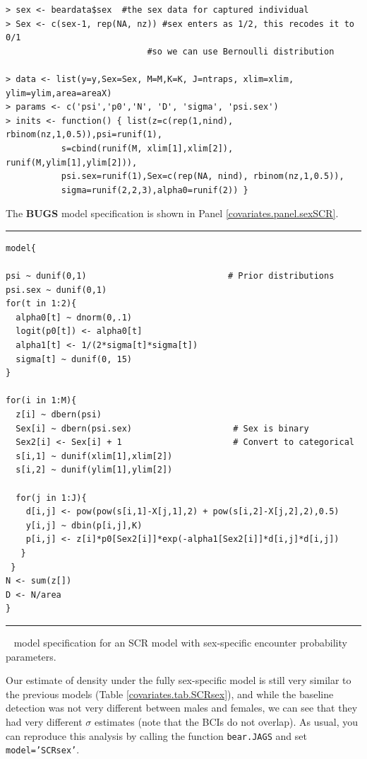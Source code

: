 {\small
\begin{verbatim}
> sex <- beardata$sex  #the sex data for captured individual
> Sex <- c(sex-1, rep(NA, nz)) #sex enters as 1/2, this recodes it to 0/1
                            #so we can use Bernoulli distribution 

> data <- list(y=y,Sex=Sex, M=M,K=K, J=ntraps, xlim=xlim, ylim=ylim,area=areaX)
> params <- c('psi','p0','N', 'D', 'sigma', 'psi.sex')
> inits <- function() { list(z=c(rep(1,nind), rbinom(nz,1,0.5)),psi=runif(1), 
           s=cbind(runif(M, xlim[1],xlim[2]), runif(M,ylim[1],ylim[2])),
           psi.sex=runif(1),Sex=c(rep(NA, nind), rbinom(nz,1,0.5)), 
           sigma=runif(2,2,3),alpha0=runif(2)) }
\end{verbatim}
}
{\flushleft The} {\bf BUGS} model specification is shown in Panel 
\ref{covariates.panel.sexSCR}.

 
\begin{panel}[htp]
\centering
\rule[0.1in]{\textwidth}{.03in}
{\small
\begin{verbatim}
model{

psi ~ dunif(0,1)                            # Prior distributions
psi.sex ~ dunif(0,1)
for(t in 1:2){                             
  alpha0[t] ~ dnorm(0,.1)
  logit(p0[t]) <- alpha0[t]
  alpha1[t] <- 1/(2*sigma[t]*sigma[t])
  sigma[t] ~ dunif(0, 15)
}

for(i in 1:M){
  z[i] ~ dbern(psi)
  Sex[i] ~ dbern(psi.sex)                    # Sex is binary
  Sex2[i] <- Sex[i] + 1                      # Convert to categorical
  s[i,1] ~ dunif(xlim[1],xlim[2])
  s[i,2] ~ dunif(ylim[1],ylim[2])

  for(j in 1:J){
    d[i,j] <- pow(pow(s[i,1]-X[j,1],2) + pow(s[i,2]-X[j,2],2),0.5)
    y[i,j] ~ dbin(p[i,j],K)
    p[i,j] <- z[i]*p0[Sex2[i]]*exp(-alpha1[Sex2[i]]*d[i,j]*d[i,j])
   }
 }
N <- sum(z[])
D <- N/area
}
\end{verbatim}
}

\rule[-0.1in]{\textwidth}{.03in}
\caption{
\jags~ model specification for an SCR model with sex-specific 
encounter probability parameters.}
\label{covariates.panel.SCRsex}
\end{panel}

Our estimate of density under the fully sex-specific model is still
very similar to the previous models (Table
\ref{covariates.tab.SCRsex}), and while the baseline detection was not
very different between males and females, we can see that they had
very different $\sigma$ estimates (note that the BCIs do not overlap).
As usual, you can reproduce this analysis by calling the function 
{\tt bear.JAGS} and set {\tt model='SCRsex'}.

